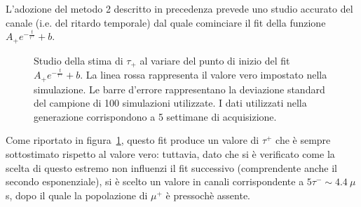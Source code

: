 \documentclass[10pt, oneside, a4paper]{article}   	%
\begin{document}
L'adozione del metodo 2 descritto in precedenza prevede uno studio accurato del canale (i.e. del ritardo temporale) dal quale cominciare il fit della funzione $A_+e^{-\frac{t}{\tau^+}}+b$. 
\begin{figure}[h]
  \centerline{}
  \caption{Studio della stima di $\tau_+$ al variare del punto di inizio del fit $A_+e^{-\frac{t}{\tau^+}}+b$. La linea rossa rappresenta il valore vero impostato nella simulazione. Le barre d'errore rappresentano la deviazione standard del campione di 100 simulazioni utilizzate. I dati utilizzati nella generazione corrispondono a 5 settimane di acquisizione.}
  \label{fig::tauplusstart}
\end{figure}
Come riportato in figura~\ref{fig::tauplusstart}, questo fit produce un valore di $\tau^+$ che è sempre sottostimato rispetto al valore vero: tuttavia, dato che si è verificato come la scelta di questo estremo non influenzi il fit successivo (comprendente anche il secondo esponenziale), si è scelto un valore in canali corrispondente a $5\tau^-\sim4.4\ \mu$s, dopo il quale la popolazione di $\mu^+$ è pressochè assente.
\end{document}
